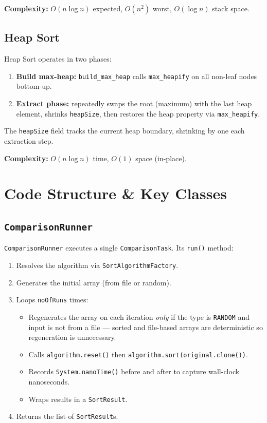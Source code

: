 \documentclass[12pt,a4paper]{article}
\begin{document}
\textbf{Complexity:} $O(n \log n)$ expected, $O(n^2)$ worst, $O(\log n)$ stack space.

\subsection{Heap Sort}

Heap Sort operates in two phases:

\begin{enumerate}[nosep]
    \item \textbf{Build max-heap:} \texttt{build\_max\_heap} calls
          \texttt{max\_heapify} on all non-leaf nodes bottom-up.
    \item \textbf{Extract phase:} repeatedly swaps the root (maximum) with the
          last heap element, shrinks \texttt{heapSize}, then restores the heap
          property via \texttt{max\_heapify}.
\end{enumerate}

The \texttt{heapSize} field tracks the current heap boundary, shrinking by one
each extraction step.

\textbf{Complexity:} $O(n \log n)$ time, $O(1)$ space (in-place).

\section{Code Structure \& Key Classes}

\subsection{\texttt{ComparisonRunner}}

\texttt{ComparisonRunner} executes a single \texttt{ComparisonTask}. Its
\texttt{run()} method:

\begin{enumerate}[nosep]
    \item Resolves the algorithm via \texttt{SortAlgorithmFactory}.
    \item Generates the initial array (from file or random).
    \item Loops \texttt{noOfRuns} times:
    \begin{itemize}[nosep]
        \item Regenerates the array on each iteration \emph{only} if the
              type is \texttt{RANDOM} and input is not from a file — sorted
              and file-based arrays are deterministic so regeneration is
              unnecessary.
        \item Calls \texttt{algorithm.reset()} then \texttt{algorithm.sort(original.clone())}.
        \item Records \texttt{System.nanoTime()} before and after to capture
              wall-clock nanoseconds.
        \item Wraps results in a \texttt{SortResult}.
    \end{itemize}
    \item Returns the list of \texttt{SortResult}s.
\end{enumerate}
\end{document}
